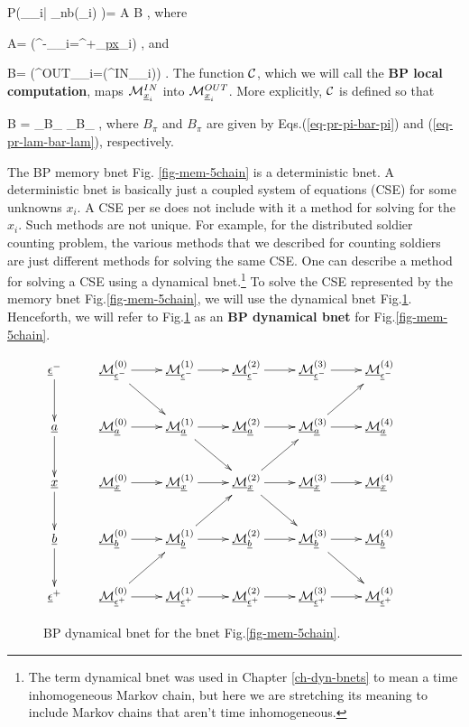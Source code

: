 \beq\color{blue}
P(\calm_{\rvx_i}|
\calm_{\rvn\in nb(\rvx_i)}
)= A B
\;,
\eeq
where

\beq
A=
\indi(\calm^{-}_{\rvx_i}=\calm^{+}_{\ul{px}_i})
\;,
\eeq
and

\beq
B=
\indi(\calm^{OUT}_{\rvx_i}=\calc(\calm^{IN}_{\rvx_i}))
\label{eq-mp-update-static}
\;.
\eeq
The function ${\cal C}$,
which
we will call the {\bf BP local computation},
maps $\calm^{IN}_{\rvx_i}$
into $\calm^{OUT}_{\rvx_i}$. More explicitly,
${\cal C}$ is defined so that

\beq
B
=
_{B_\pi}
_{B_\pi}
\;,
\eeq
where
$B_\pi$ and $B_\pi$
are given by Eqs.(\ref{eq-pr-pi-bar-pi})
and (\ref{eq-pr-lam-bar-lam}),
respectively.



The BP memory bnet
 Fig.
\ref{fig-mem-5chain}
is a deterministic bnet.
A deterministic bnet
is basically
just a coupled system
of equations (CSE)
for some unknowns $x_i$.
A CSE per se does not
include with it a method for
solving for the $x_i$. Such methods are not
unique.
For example,
for the
distributed
soldier counting
problem,
the various
methods that
we described
for counting soldiers
are just different
methods
for solving the same
CSE.
One can describe
a method for solving a
CSE using a dynamical bnet.\footnote{
The term
dynamical bnet
was used in Chapter \ref{ch-dyn-bnets}
to mean a time inhomogeneous
Markov chain, but
here we are stretching its meaning to
include
Markov chains
that aren't
time inhomogeneous.}
To solve
the CSE
represented by
the memory bnet Fig.\ref{fig-mem-5chain},
we will use the
dynamical bnet
Fig.\ref{fig-propagation-5chain}.
Henceforth,
we will refer to
Fig.\ref{fig-propagation-5chain} as
an {\bf BP dynamical bnet}
for Fig.\ref{fig-mem-5chain}.

\begin{figure}
$$\xymatrix{
\rveps^-\ar[d]
&\ucalm^{(0)}_{\rveps^-}\ar[r]\ar[dr]
&\ucalm^{(1)}_{\rveps^-}\ar[r]
&\ucalm^{(2)}_{\rveps^-}\ar[r]
&\ucalm^{(3)}_{\rveps^-}\ar[r]
&\ucalm^{(4)}_{\rveps^-}
&
\\
\rva\ar[d]
&\ucalm^{(0)}_{\rva}\ar[r]
&\ucalm^{(1)}_{\rva}\ar[r]\ar[dr]
&\ucalm^{(2)}_{\rva}\ar[r]
&\ucalm^{(3)}_{\rva}\ar[r]\ar[ur]
&\ucalm^{(4)}_{\rva}
\\
\rvx\ar[d]
&\ucalm^{(0)}_{\rvx}\ar[r]
&\ucalm^{(1)}_{\rvx}\ar[r]
&\ucalm^{(2)}_{\rvx}\ar[r]\ar[dr]\ar[ur]
&\ucalm^{(3)}_{\rvx}\ar[r]
&\ucalm^{(4)}_{\rvx}
\\
\rvb\ar[d]
&\ucalm^{(0)}_{\rvb}\ar[r]
&\ucalm^{(1)}_{\rvb}\ar[r]\ar[ur]
&\ucalm^{(2)}_{\rvb}\ar[r]
&\ucalm^{(3)}_{\rvb}\ar[r]\ar[dr]
&\ucalm^{(4)}_{\rvb}
\\
\rveps^+
&\ucalm^{(0)}_{\rveps^+}\ar[r]\ar[ur]
&\ucalm^{(1)}_{\rveps^+}\ar[r]
&\ucalm^{(2)}_{\rveps^+}\ar[r]
&\ucalm^{(3)}_{\rveps^+}\ar[r]
&\ucalm^{(4)}_{\rveps^+}
}$$
\caption{BP dynamical bnet for the bnet
  Fig.\ref{fig-mem-5chain}.}
\label{fig-propagation-5chain}
\end{figure}


